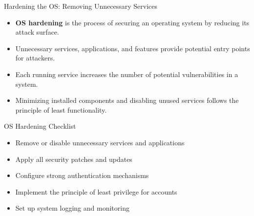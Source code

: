 \documentclass{beamer}
\begin{document}
            \begin{frame}{Hardening the OS: Removing Unnecessary Services}
            \begin{itemize}
                \item \textbf{OS hardening} is the process of securing an operating system by reducing its attack surface.
                \item Unnecessary services, applications, and features provide potential entry points for attackers.
                \item Each running service increases the number of potential vulnerabilities in a system.
                \item Minimizing installed components and disabling unused services follows the principle of least functionality.
            \end{itemize}
            
            \begin{exampleblock}{OS Hardening Checklist}
            \begin{itemize}
                \item Remove or disable unnecessary services and applications
                \item Apply all security patches and updates
                \item Configure strong authentication mechanisms
                \item Implement the principle of least privilege for accounts
                \item Set up system logging and monitoring
            \end{itemize}
            \end{exampleblock}
            \end{frame}
            
\end{document}
